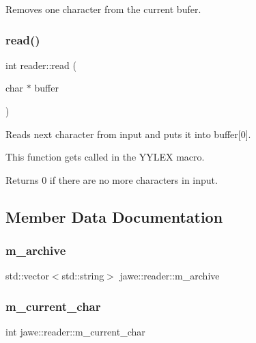 Removes one character from the current bufer. \mbox{\label{classjawe_1_1reader_a5937acad6c1094dc46e1dfdadd9fd94b}} 
\subsubsection{\texorpdfstring{read()}{read()}}
{\footnotesize\ttfamily int reader\+::read (\begin{DoxyParamCaption}\item[{char $\ast$}]{buffer }\end{DoxyParamCaption})}

Reads next character from input and puts it into buffer\mbox{[}0\mbox{]}.

This function gets called in the Y\+Y\+L\+EX macro. \begin{DoxyReturn}{Returns}
0 if there are no more characters in input. 
\end{DoxyReturn}


\subsection{Member Data Documentation}
\mbox{\label{classjawe_1_1reader_a912c0f8fe8963fbdd6aba7e7d2424072}} 
\subsubsection{\texorpdfstring{m\+\_\+archive}{m\_archive}}
{\footnotesize\ttfamily std\+::vector$<$std\+::string$>$ jawe\+::reader\+::m\+\_\+archive\hspace{0.3cm}{\ttfamily [private]}}

\mbox{\label{classjawe_1_1reader_ace2997e2bb0166b8fc46686379269a58}} 
\subsubsection{\texorpdfstring{m\+\_\+current\+\_\+char}{m\_current\_char}}
{\footnotesize\ttfamily int jawe\+::reader\+::m\+\_\+current\+\_\+char\hspace{0.3cm}{\ttfamily [private]}}

